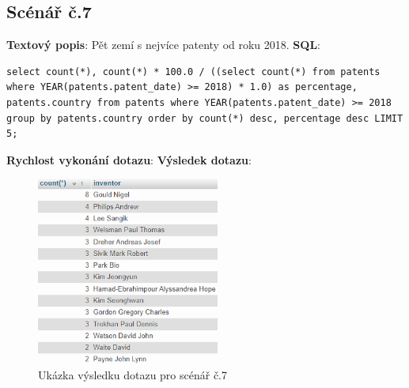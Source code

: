 \subsection{Scénář č.7}
\textbf{Textový popis}: Pět zemí s nejvíce patenty od roku 2018.
\newline
\textbf{SQL}: 
\begin{lstlisting}[label = {lst:elements_a}]
select count(*), count(*) * 100.0 / ((select count(*) from patents where YEAR(patents.patent_date) >= 2018) * 1.0) as percentage, patents.country from patents where YEAR(patents.patent_date) >= 2018 group by patents.country order by count(*) desc, percentage desc LIMIT 5;
\end{lstlisting}
\textbf{Rychlost vykonání dotazu}: 
\newline
\textbf{Výsledek dotazu}:
\begin{figure}[H]
\centering
\includegraphics[width=6cm]{img/scenare/scenar_9}
\caption{Ukázka výsledku dotazu pro scénář č.7}
\label{fig:scenar7}
\end{figure}

